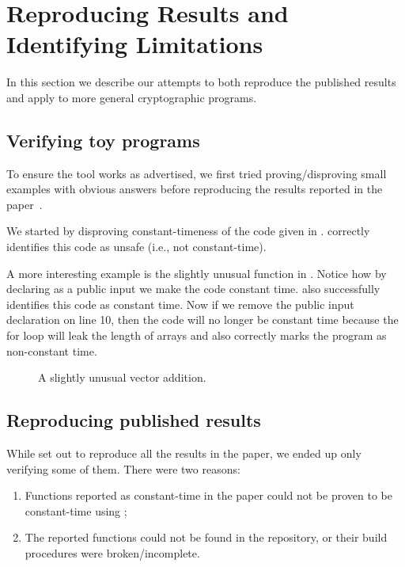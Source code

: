 \section{Reproducing Results and Identifying Limitations}
\label{sec:reproducing-results}

In this section we describe our attempts to both reproduce the published results and apply \ctVerif to more general cryptographic programs.

\subsection{Verifying toy programs}

To ensure the tool works as advertised, we first tried proving/disproving small examples with obvious answers before reproducing the
results reported in the paper~\cite{almeida}.

We started by disproving constant-timeness of the code given in .
\ctVerif correctly identifies this code as unsafe (i.e., not constant-time).

A more interesting example is the slightly unusual 
function in . Notice how by declaring  as
a public input we make the code constant time. \ctVerif also successfully
identifies this code as constant time. Now if we remove the public input
declaration on line 10, then the code will no longer be constant time because the
for loop will leak the length of arrays and \ctVerif also correctly marks the
program as non-constant time.

\begin{figure}[h]
    \centering\resizebox{0.7\columnwidth}{!}{}
    \caption{A slightly unusual vector addition.}
    \label{fig:vector_add}
\end{figure}


\subsection{Reproducing published results}

While set out to reproduce all the results in the paper, we ended up
only verifying some of them. There were two reasons:
\begin{enumerate}
    \item Functions reported as constant-time in the paper could not be proven
    to be constant-time using \ctVerif;
    \item The reported functions could not be found in the \ctVerif repository,
    or their build procedures were broken/incomplete.
\end{enumerate}

